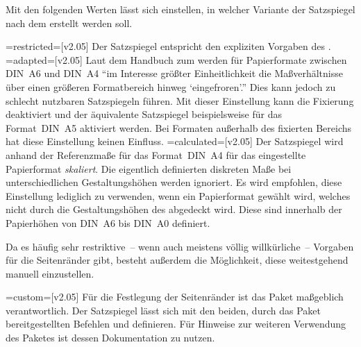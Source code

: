 \begin{DeclareEntity*}{}
\begin{DeclareEntity*}{}
\begin{DeclareEntity*}{}
\begin{Declaration}
\begin{DeclareValues}
\end{DeclareValues}
%
%
Mit den folgenden Werten lässt sich einstellen, in welcher Variante der 
Satzspiegel nach dem \TUDCD erstellt werden soll. 
%
\begin{DeclareValues}
\itemval=restricted=[v2.05]
  Der Satzspiegel entspricht den expliziten Vorgaben des \CDs.
\itemval=adapted=[v2.05]
  Laut dem Handbuch zum \CD werden für Papierformate zwischen DIN~A6 und DIN~A4 
  \enquote{im Interesse größter Einheitlichkeit die Maßverhältnisse über einen 
  größeren Formatbereich hinweg \enquote{eingefroren}.} Dies kann jedoch zu 
  schlecht nutzbaren Satzspiegeln führen. Mit dieser Einstellung kann die 
  Fixierung deaktiviert und der äquivalente Satzspiegel beispielsweise für das 
  Format~DIN~A5 aktiviert werden. Bei Formaten außerhalb des fixierten Bereichs 
  hat diese Einstellung keinen Einfluss. 
\itemval=calculated=[v2.05]
  Der Satzspiegel wird anhand der Referenzmaße für das Format~DIN~A4 für das 
  eingestellte Papierformat \emph{skaliert}. Die eigentlich definierten 
  diskreten Maße bei unterschiedlichen Gestaltungshöhen werden ignoriert. Es 
  wird empfohlen, diese Einstellung lediglich zu verwenden, wenn ein 
  Papierformat gewählt wird, welches nicht durch die Gestaltungshöhen des 
  \TUDCDs abgedeckt wird. Diese sind innerhalb der Papierhöhen von DIN~A6 bis 
  DIN~A0 definiert.
\end{DeclareValues}
%
Da es häufig sehr restriktive~-- wenn auch meistens völlig willkürliche~-- 
Vorgaben für die Seitenränder gibt, besteht außerdem die Möglichkeit, diese 
weitestgehend manuell einzustellen. 
\begin{DeclareValues}
\itemval=custom=[v2.05]
  Für die Festlegung der Seitenränder ist das Paket  
  maßgeblich verantwortlich. Der Satzspiegel lässt sich mit den beiden, durch 
  das Paket bereitgestellten Befehlen  
  und  definieren. Für Hinweise zur 
  weiteren Verwendung des Paketes  ist dessen Dokumentation 
  zu nutzen.
\end{DeclareValues}
\end{Declaration}



\end{DeclareEntity*}
\end{DeclareEntity*}
\end{DeclareEntity*}

